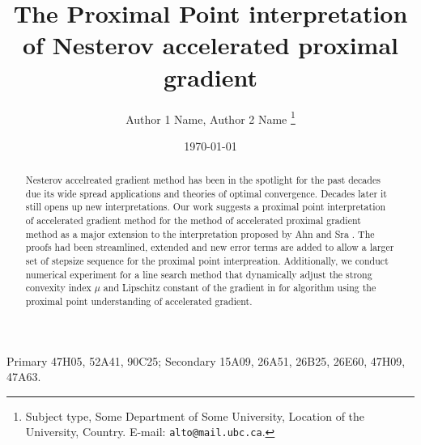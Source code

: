\documentclass[12pt]{article}
\begin{document}
\title{{\selectfont The Proximal Point interpretation of Nesterov accelerated proximal gradient}}

\author{
    Author 1 Name, Author 2 Name
    \thanks{
        Subject type, Some Department of Some University, Location of the University,
        Country. E-mail: \texttt{alto@mail.ubc.ca}.
    }
}

\date{\today}

\maketitle


\begin{abstract} 
    \noindent
    Nesterov accelreated gradient method has been in the spotlight for the past decades due its wide spread applications and theories of optimal convergence. 
    Decades later it still opens up new interpretations. 
    Our work suggests a proximal point interpretation of accelerated gradient method for the method of accelerated proximal gradient method as a major extension to the interpretation proposed by Ahn and Sra \cite{ahn_understanding_2022}. 
    The proofs had been streamlined, extended and new error terms are added to allow a larger set of stepsize sequence for the proximal point interpreation. 
    Additionally, we conduct numerical experiment for a line search method that dynamically adjust the strong convexity index $\mu$ and Lipschitz constant of the gradient in for algorithm  using the proximal point understanding of accelerated gradient. 
    
\end{abstract}

Primary 47H05, 52A41, 90C25; Secondary 15A09, 26A51, 26B25, 26E60, 47H09, 47A63.
\end{document}
